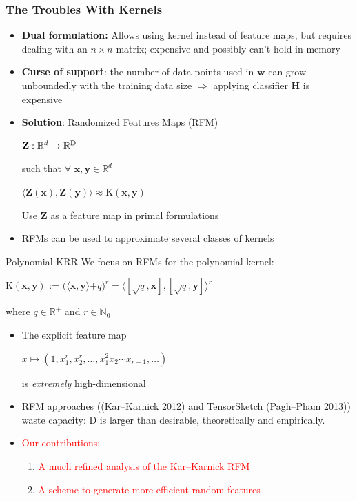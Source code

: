 \documentclass[xcolor=x11names,compress,ignorenonframetext,10pt]{beamer}
\renewcommand{\(}{\begin{columns}}
\renewcommand{\)}{\end{columns}}
\newcommand{\<}[1]{\begin{column}{#1}}
\renewcommand{\>}{\end{column}}
\def\refcolor{DodgerBlue4}
\newcommand{\refer}[1]{({\color{\refcolor}#1})}
\begin{document}
\begin{frame}
\frametitle{The Troubles With Kernels}
\begin{itemize}
    \item \textbf{Dual formulation:} Allows using kernel instead of feature maps, but requires dealing with an $n \times n$ matrix; expensive and possibly can't hold in memory
    \item \textbf{Curse of support}: the number of data points used in $\mathbf{w}$ can grow unboundedly with the training data size $\Rightarrow$ applying classifier $\mathbf{H}$ is expensive
\item \textbf{Solution}: Randomized Features Maps (RFM)\\
\begin{center}
$\textbf{Z}: \mathbb{R}^d \rightarrow \mathbb{R}^{\textrm{\textrm{D}}}$
\end{center}
such that $\forall$ $\mathbf{x}, \mathbf{y} \in \mathbb{R}^d$
\begin{center}
$\langle \textbf{Z}(\mathbf{x}), \textbf{Z}(\mathbf{y}) \rangle \approx \textrm{K}(\mathbf{x},\mathbf{y})$
\end{center}
Use $\mathbf{Z}$ as a feature map in primal formulations
\item RFMs can be used to approximate several classes of kernels
\end{itemize}
\end{frame}

\begin{frame}{Polynomial KRR}
  We focus on RFMs for the polynomial kernel:
\begin{center}
$\textrm{K}(\mathbf{x},\mathbf{y})$ := $(\langle \mathbf{x}, \mathbf{y} \rangle$$+q)^r = \langle [\sqrt{q}, \mathbf{x}], [\sqrt{q}, \mathbf{y}] \rangle^r$
\end{center}
where $q \in \mathbb{R}^{+}$ and $r \in \mathbb{N}_{0}$

\begin{itemize}
    \item The explicit feature map 
        \begin{center}
            $x \mapsto (1, x_1^r, x_2^r, \ldots, x_1^2 x_2 \cdots x_{r-1}, \ldots)$
        \end{center}
        is \emph{extremely} high-dimensional
      \item RFM approaches (\refer{Kar--Karnick 2012} and TensorSketch \refer{Pagh--Pham 2013}) waste capacity: $\mathrm{D}$ is larger than desirable, theoretically and empirically.
    
    \item \textcolor{red}{Our contributions:}
        \begin{enumerate}
            \item\textcolor{red}{A much refined analysis of the Kar--Karnick RFM}
            \item \textcolor{red}{A scheme to generate more efficient random features}
        \end{enumerate}
\end{itemize}

\end{frame}
\end{document}
